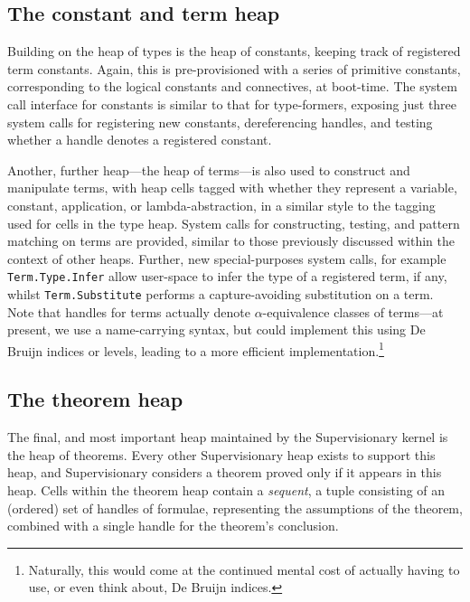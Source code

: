 \documentclass[a4paper, UKenglish, cleveref, autoref, thm-restate, colorlinks]{lipics-v2021}
\begin{document}
\subsection{The constant and term heap}

Building on the heap of types is the heap of constants, keeping track of registered term constants.
Again, this is pre-provisioned with a series of primitive constants, corresponding to the logical constants and connectives, at boot-time.
The system call interface for constants is similar to that for type-formers, exposing just three system calls for registering new constants, dereferencing handles, and testing whether a handle denotes a registered constant.

Another, further heap---the heap of terms---is also used to construct and manipulate terms, with heap cells tagged with whether they represent a variable, constant, application, or lambda-abstraction, in a similar style to the tagging used for cells in the type heap.
System calls for constructing, testing, and pattern matching on terms are provided, similar to those previously discussed within the context of other heaps.
Further, new special-purposes system calls, for example \texttt{Term.Type.Infer} allow user-space to infer the type of a registered term, if any, whilst \texttt{Term.Substitute} performs a capture-avoiding substitution on a term.
Note that handles for terms actually denote $\alpha$-equivalence classes of terms---at present, we use a name-carrying syntax, but could implement this using De Bruijn indices or levels, leading to a more efficient implementation.\footnote{Naturally, this would come at the continued mental cost of actually having to use, or even think about, De Bruijn indices.}

\subsection{The theorem heap}

The final, and most important heap maintained by the Supervisionary kernel is the heap of theorems.
Every other Supervisionary heap exists to support this heap, and Supervisionary considers a theorem proved only if it appears in this heap.
Cells within the theorem heap contain a \emph{sequent}, a tuple consisting of an (ordered) set of handles of formulae, representing the assumptions of the theorem, combined with a single handle for the theorem's conclusion.
\end{document}
